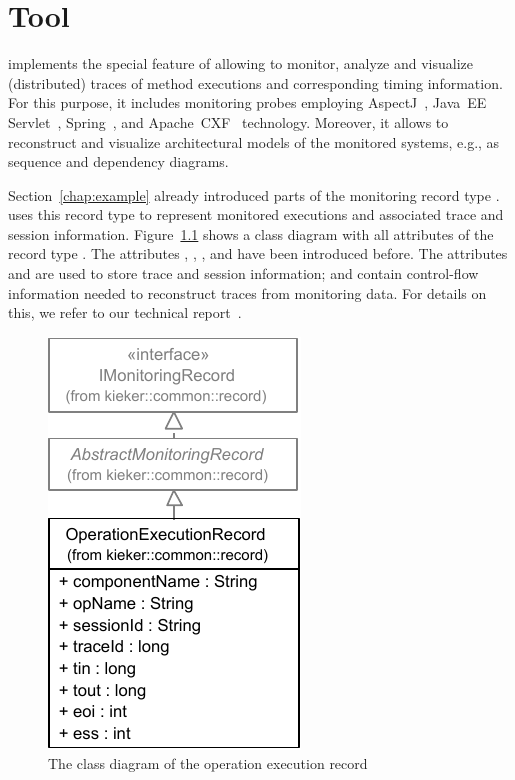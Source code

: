 % 

\chapter{\KiekerTraceAnalysis{} Tool}\label{chap:aspectJ}

\KiekerTraceAnalysis{} implements the special feature of \Kieker{} allowing to %
monitor, analyze and visualize (distributed) traces of method executions and %
corresponding timing information. For this purpose, it includes monitoring probes employing %
AspectJ~\cite{AspectJ-WebSite}, Java~EE Servlet~\cite{JavaServletTechnology-WebSite}, %
Spring~\cite{Spring-WebSite}, and Apache~CXF~\cite{CXF-WebSite} technology. %
Moreover, it allows to reconstruct and visualize architectural models of the %
monitored systems, e.g., as sequence and dependency diagrams. %

Section~\ref{chap:example} already introduced parts of the monitoring record %
type . \KiekerTraceAnalysis{} uses this record %
type to represent monitored executions and associated trace and session information. %
Figure~\ref{fig:OperationExecutionRecordClassDiagramComplete} shows a class diagram %
with all attributes of the record type . %
The attributes , , %
, and  have been introduced before. %
The attributes  and  are used to store %
trace and session information;  and  contain control-flow %
information needed to reconstruct traces from monitoring data. %
For details on this, we refer to our technical %
report~\cite{vanHoornRohrHasselbringWallerEhlersFreyKieselhorst2009TRContinuousMonitoringOfSoftwareServicesDesignAndApplicationOfTheKiekerFramework}.

\begin{figure}[hb]\centering
\includegraphics[scale=0.8]{images/kieker_OperationExecutionRecord-complete-modified}%
\caption{The class diagram of the operation execution record}
\label{fig:OperationExecutionRecordClassDiagramComplete}
\end{figure}

